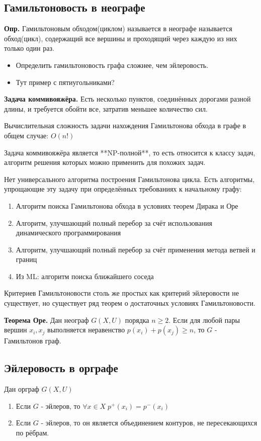 \documentclass[10pt]{article}
\begin{document}
\subsection*{Гамильтоновость в неографе}
\par\textbf{Опр.} Гамильтоновым обходом(циклом) называется в неографе называется обход(цикл), содержащий все вершины и проходящий через каждую из них только один раз.
\begin{itemize}
    \item Определить гамильтоновость графа сложнее, чем эйлеровость.
    \item Тут пример с пятиугольниками?
\end{itemize}
\par\textbf{Задача коммивояжёра.} Есть несколько пунктов, соединённых дорогами разной длины, и требуется обойти все, затратив меньшее количество сил.
\par Вычислительная сложность задачи нахождения Гамильтонова обхода в графе в общем случае: $O(n!)$
\par Задача коммивояжёра является **NP-полной**, то есть относится к классу задач, алгоритм решения которых можно применить для похожих задач.
\par Нет универсального алгоритма построения Гамильтонова цикла. Есть алгоритмы, упрощающие эту задачу при определённых требованиях к начальному графу:
\begin{enumerate}
    \item Алгоритм поиска Гамильтонова обхода в условиях теорем Дирака и Оре
    \item Алгоритм, улучшающий полный перебор за счёт использования динамического программирования
    \item Алгоритм, улучшающий полный перебор за счёт применения метода ветвей и границ
    \item Из ML: алгоритм поиска ближайшего соседа
\end{enumerate}

\par Критериев Гамильтоновости столь же простых как критерий эйлеровости не существует, но существует ряд теорем о достаточных условиях Гамильтоновости.
\par\textbf{Теорема Оре.} Дан неограф $G(X, U)$ порядка $n \geq 2$. Если для любой пары вершин $x_{i}, x_{j}$ выполняется неравенство $p(x_{i}) + p(x_{j}) \geq n$, то $G$ - Гамильтонов граф.

\subsection*{Эйлеровость в орграфе}
\par Дан орграф $G(X, U)$
\begin{enumerate}
    \item Если $G$ - эйлеров, то $\forall x \in X \; p^+(x_{i}) = p^-(x_{i})$
    \item Если $G$ - эйлеров, то он является объединением контуров, не пересекающихся по рёбрам.
\end{enumerate}
\end{document}
